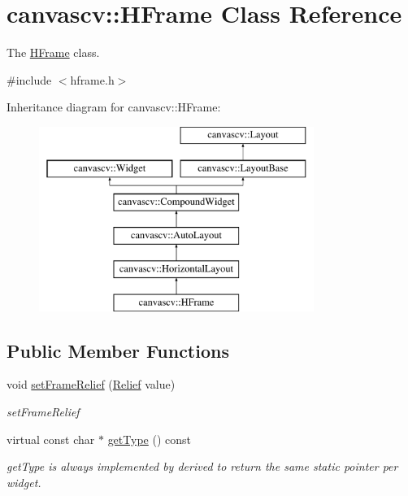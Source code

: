 \hypertarget{classcanvascv_1_1HFrame}{}\section{canvascv\+:\+:H\+Frame Class Reference}
\label{classcanvascv_1_1HFrame}


The \hyperlink{classcanvascv_1_1HFrame}{H\+Frame} class.  




{\ttfamily \#include $<$hframe.\+h$>$}

Inheritance diagram for canvascv\+:\+:H\+Frame\+:\begin{figure}[H]
\begin{center}
\leavevmode
\includegraphics[height=6.000000cm]{classcanvascv_1_1HFrame}
\end{center}
\end{figure}
\subsection*{Public Member Functions}
\begin{DoxyCompactItemize}
\item 
void \hyperlink{classcanvascv_1_1HFrame_a7daeeda5533657170a35bdf78baf511c}{set\+Frame\+Relief} (\hyperlink{classcanvascv_1_1Widget_a8253daa509c55c24c92ce0d3dd93e4cd}{Relief} value)
\begin{DoxyCompactList}\small\item\em set\+Frame\+Relief \end{DoxyCompactList}\item 
virtual const char $\ast$ \hyperlink{classcanvascv_1_1HFrame_a32535b523b26b4db03f46a59fda8237a}{get\+Type} () const 
\begin{DoxyCompactList}\small\item\em get\+Type is always implemented by derived to return the same static pointer per widget. \end{DoxyCompactList}\end{DoxyCompactItemize}
